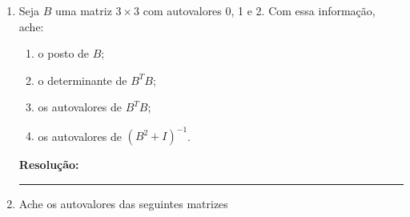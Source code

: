 \documentclass[leqno]{article}
\numberwithin{equation}{section}
\newenvironment{sol} 
{
    \vspace{4mm}
    \noindent\textbf{Resolução:}
    \strut\newline
    \smallskip
    \hspace{-3.5mm} 
} 
{\noindent\rule{4cm}{.1mm}}
\begin{document}
\begin{enumerate}


\item Seja $B$ uma matriz $3 \times 3$ com autovalores 0, 1 e 2. Com  essa informação, ache:

\begin{enumerate}

\item o posto de $B$;

\item o determinante de $B^TB$;

\item os autovalores de $B^TB$;

\item os autovalores de $(B^2 + I)^{-1}$.

\end{enumerate}

\begin{sol}

    
\end{sol}


\item Ache os autovalores das seguintes matrizes

\end{enumerate}
\end{document}
